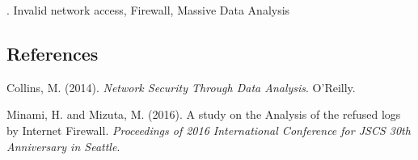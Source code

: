 \documentclass[12pt]{article}
\begin{document}
.
Invalid network access, Firewall, Massive Data Analysis

%        
%
%        

\subsection*{References}

\begin{description}
\item
Collins, M. (2014). \textit{Network Security Through Data Analysis}. O'Reilly.

\item
Minami, H. and Mizuta, M. (2016). A study on the Analysis of the refused
logs by Internet Firewall. \textit {Proceedings of 2016 International
  Conference for JSCS 30th Anniversary in Seattle}.

\end{description}
\end{document}

